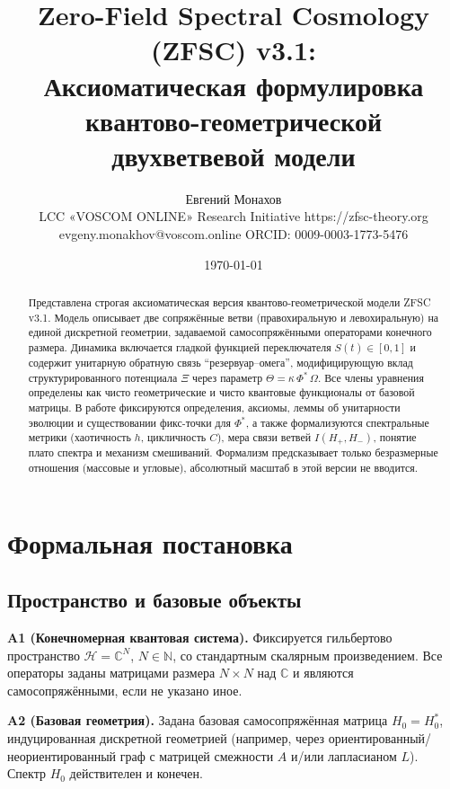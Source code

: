 \documentclass[a4paper,12pt]{article}
\title{Zero-Field Spectral Cosmology (ZFSC) v3.1: \\
Аксиоматическая формулировка квантово-геометрической двухветвевой модели}
\author{Евгений Монахов \\ LCC «VOSCOM ONLINE» Research Initiative https://zfsc-theory.org\\ evgeny.monakhov@voscom.online ORCID: 0009-0003-1773-5476}
\date{\today}
\begin{document}
\maketitle

\begin{abstract}
Представлена строгая аксиоматическая версия квантово-геометрической модели ZFSC v3.1.
Модель описывает две сопряжённые ветви (правохиральную и левохиральную) на единой дискретной геометрии, задаваемой самосопряжёнными операторами конечного размера.
Динамика включается гладкой функцией переключателя $S(t)\in[0,1]$ и содержит унитарную обратную связь ``резервуар--омега'', модифицирующую вклад структурированного потенциала $\Xi$ через параметр $\Theta=\kappa\,\Phi^\ast\,\Omega$.
Все члены уравнения определены как чисто геометрические и чисто квантовые функционалы от базовой матрицы.
В работе фиксируются определения, аксиомы, леммы об унитарности эволюции и существовании фикс-точки для $\Phi^\ast$, а также формализуются спектральные метрики (хаотичность $h$, цикличность $C$), мера связи ветвей $I(H_+,H_-)$, понятие плато спектра и механизм смешиваний.
Формализм предсказывает только безразмерные отношения (массовые и угловые), абсолютный масштаб в этой версии не вводится.
\end{abstract}

\section{Формальная постановка}
\subsection*{Пространство и базовые объекты}
\textbf{A1 (Конечномерная квантовая система).}
Фиксируется гильбертово пространство $\mathcal{H}=\mathbb{C}^N$, $N\in\mathbb{N}$, со стандартным скалярным произведением.
Все операторы заданы матрицами размера $N\times N$ над $\mathbb{C}$ и являются самосопряжёнными, если не указано иное.

\textbf{A2 (Базовая геометрия).}
Задана базовая самосопряжённая матрица $H_0=H_0^\ast$, индуцированная дискретной геометрией (например, через ориентированный/неориентированный граф с матрицей смежности $A$ и/или лапласианом $L$).
Спектр $H_0$ действителен и конечен.
\end{document}
